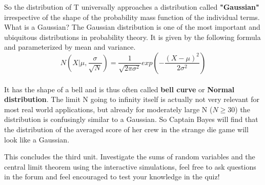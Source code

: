 \documentclass[12pt, a4paper]{scrartcl}
\begin{document}
So the distribution of T universally approaches a distribution called  \textbf{"Gaussian"} irrespective of the shape of the probability mass function of the individual terms.\\
What is a Gaussian?
The Gaussian distribution is one of the most important and ubiquitous distributions in probability theory. It is given by the following formula and parameterized by mean and variance.
\begin{equation*}\boxed{
N(X|\mu, \frac{\sigma}{\sqrt{N}})=\frac{1}{\sqrt{2\pi \sigma ^2}}exp\left(-\frac{(X-\mu)^2}{2\sigma^2}\right)
}\end{equation*}\\
It has the shape of a bell and is thus often called  \textbf{bell curve} or  \textbf{Normal distribution}.
The limit N going to infinity itself is actually not very relevant for most real world applications, but already for moderately large N ($N\geq 30$) the distribution is confusingly similar to a Gaussian. 
So Captain Bayes will find that the distribution of the averaged score of her crew in the strange die game will look like a Gaussian.


This concludes the third unit. Investigate the sums of random variables and the central limit theorem using the interactive simulations,  feel free to ask questions in the forum and feel encouraged to test your knowledge in the quiz!
\end{document}

